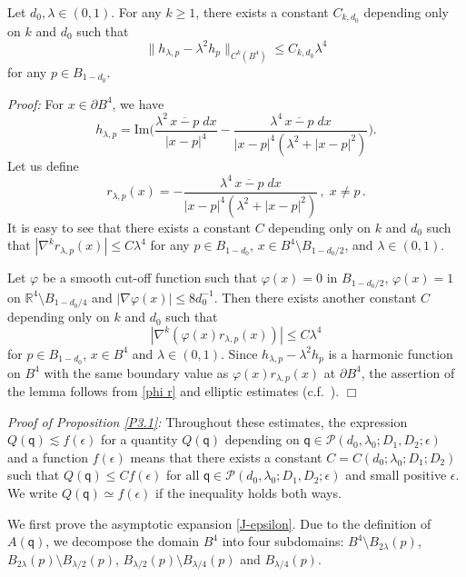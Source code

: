 \documentclass[11pt]{article}
\numberwithin{equation}{section} \setlength{\topmargin}{-35pt}
\newcommand{\PP}{\mathcal{P}}
\newcommand{\R}{\mathbb{R}}
\newcommand{\q}{\mathsf{q}}
\begin{document}
\begin{lemma} \label{L5.6}  Let $d_0,\lambda\in(0,1)$. For any $k\ge 1$, there exists a constant $C_{k,d_0}$ depending only on $k$ and $d_0$ such that
$$\|h_{\lambda,p}-\lambda^2h_p\|_{C^k(B^4)}\le C_{k,d_0}\lambda^4$$
for any $p\in B_{1-d_0}$.
\end{lemma}
\textit{Proof:} For $x\in\partial B^4$, we have
\begin{equation}
\label{5.9}
h_{\lambda,p}=\text{Im}\biggl(\frac{\lambda^2\,\overline{x-p}\;dx}{|x-p|^4}
-\frac{\lambda^4\,\overline{x-p}\;dx}{|x-p|^4(\lambda^2+|x-p|^2)}\biggr).
\end{equation}
Let us define
$$r_{\lambda,p}(x)=-\frac{\lambda^4\,\overline{x-p}\;dx}{|x-p|^4(\lambda^2+|x-p|^2)}\,,\; x\neq p\,.$$
It is easy to see that there exists a constant $C$ depending only on
$k$ and $d_0$ such that $|\nabla^kr_{\lambda,p}(x)|\le C\lambda^4$
for any $p\in B_{1-d_0}$, $x\in B^4\setminus B_{1-d_0/2}$, and
$\lambda\in(0,1)$.

Let $\varphi$ be a smooth cut-off function such that $\varphi(x)=0$
in $B_{1-d_0/2}$, $\varphi(x)=1$ on $\R^4\setminus B_{1-d_0/4}$ and
$|\nabla\varphi(x)|\le 8d_0^{-1}$. Then there exists another
constant $C$ depending only on $k$ and $d_0$ such that
\begin{equation}
\label{phi r} |\nabla^k(\varphi(x)r_{\lambda,p}(x))|\le C\lambda^4
\end{equation}
for $p\in B_{1-d_0}$, $x\in B^4$ and $\lambda\in (0,1)$. Since
$h_{\lambda,p}-\lambda^2h_p$ is a harmonic function on $B^4$ with
the same boundary value as $\varphi(x)r_{\lambda,p}(x)$ at $\partial
B^4$, the assertion of the lemma follows from \eqref{phi r} and
elliptic estimates (c.f.~\cite{GT}). \hfill$\Box$

\textit{Proof of Proposition \ref{P3.1}:} Throughout these
estimates, the expression $Q(\q)\lesssim f(\epsilon)$ for a quantity
$Q(\q)$ depending on $\q\in\PP(d_0,\lambda_0;D_1,D_2;\epsilon)$ and
a function $f(\epsilon)$ means that there exists a constant $C=
C(d_0; \lambda_0; D_1; D_2)$ such that $Q(\q)\le C f(\epsilon)$ for
all $\q\in\PP(d_0,\lambda_0;D_1,D_2;\epsilon)$ and small positive
$\epsilon$. We write $Q(\q)\simeq f(\epsilon)$ if the inequality
holds both ways.

We first prove the asymptotic expansion \eqref{J-epsilon}. Due to
the definition of $A(\q)$, we decompose the domain $B^4$ into four
subdomains: $B^4\setminus B_{2\lambda}(p)$,
$B_{2\lambda}(p)\setminus B_{\lambda/2}(p)$,
$B_{\lambda/2}(p)\setminus B_{\lambda/4}(p)$ and $B_{\lambda/4}(p)$.
\end{document}
